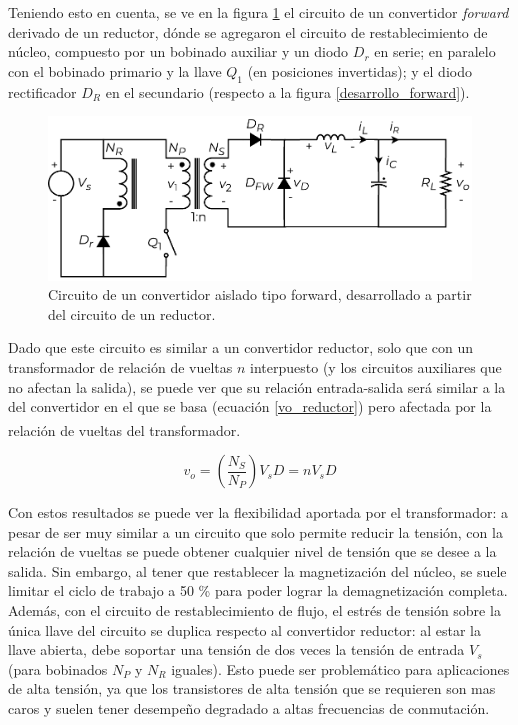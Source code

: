 Teniendo esto en cuenta, se ve en la figura \ref{forward} el circuito de un {\Medium convertidor \textit{forward}} derivado de un reductor, dónde se agregaron el circuito de restablecimiento de núcleo, compuesto por un bobinado auxiliar y un diodo $D_r$ en serie; en paralelo con el bobinado primario y la llave $Q_1$ (en posiciones invertidas); y el diodo rectificador $D_R$ en el secundario (respecto a la figura \ref{desarrollo_forward}).\\

\begin{figure}[H]
    \centering
    \includegraphics[scale=0.6]{Imagenes/Forward.pdf}
    \caption{Circuito de un convertidor aislado tipo forward, desarrollado a partir del circuito de un reductor.}
    \label{forward}
\end{figure}

Dado que este circuito es similar a un convertidor reductor, solo que con un transformador de relación de vueltas $n$ interpuesto (y los circuitos auxiliares que no afectan la salida), se puede ver que su relación entrada-salida será similar a la del convertidor en el que se basa (ecuación \ref{vo_reductor}) pero afectada por la relación de vueltas del transformador.\textsuperscript{\cite{PotenciaHart}}

\begin{equation}\label{vo_forward}
    \boxed{
        v_o = \left(\frac{N_S}{N_P}\right)V_sD = nV_sD
    }
\end{equation}

Con estos resultados se puede ver la flexibilidad aportada por el transformador: a pesar de ser muy similar a un circuito que solo permite reducir la tensión, con la relación de vueltas se puede obtener cualquier nivel de tensión que se desee a la salida. Sin embargo, al tener que restablecer la magnetización del núcleo, se suele limitar el ciclo de trabajo a 50 \% para poder lograr la demagnetización completa.\\

Además, con el circuito de restablecimiento de flujo, el estrés de tensión sobre la única llave del circuito se duplica respecto al convertidor reductor: al estar la llave abierta, debe soportar una tensión de dos veces la tensión de entrada $V_s$ (para bobinados $N_P$ y $N_R$ iguales). Esto puede ser problemático para aplicaciones de alta tensión, ya que los transistores de alta tensión que se requieren son mas caros y suelen tener desempeño degradado a altas frecuencias de conmutación.\\

